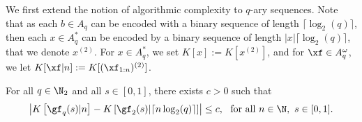 We first extend the notion of algorithmic complexity to $q$-ary sequences. Note that as each $b \in A_q$ can be encoded with a binary sequence of length $\lceil \log_2(q) \rceil$, then each $x \in A_q^\ast$ can be encoded by a binary sequence of length $|x| \lceil \log_2(q) \rceil$, that we denote $x^{(2)}$. For $x \in A_q^\ast$, we set $K[x] := K[x^{(2)}]$, and for $\xf \in A_q^\omega$, we let $K[\xf|n] := K[(\xf_{1:n})^{(2)}]$. 
\begin{theorem}\cite[Theorem 3]{staiger2002kolmogorov}\label{thm:staiger invariance}
	For all $q \in \N_2$ and  all $s \in [0,1]$, there exists $c > 0$ such that
\begin{equation}\label{eq:equivalence Kolmogorov complexity q ary expansions}
	\left| K\left[\gf_q(s)|n\right] - K\left[\gf_2(s)|\lceil n\log_2(q) \rceil\right]\right| \leq c, \ \ \text{for all} \ n \in \N, \ s \in [0,1].
\end{equation}
\end{theorem}
